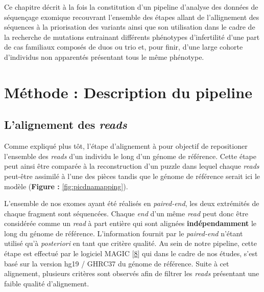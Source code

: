 \documentclass[12pt,twoside]{reedthesis}
\theoremstyle{definition}
\theoremstyle{definition}
\theoremstyle{remark}
\begin{document}
  Ce chapitre décrit à la fois la constitution d'un pipeline d'analyse des
  données de séquençage exomique recouvrant l'ensemble des étapes allant
  de l'allignement des séquences à la priorisation des variants ainsi que
  son utilisation dans le cadre de la recherche de mutations entrainant
  différents phénotypes d'infertilité d'une part de cas familiaux composés
  de duos ou trio et, pour finir, d'une large cohorte d'individus non
  apparentés présentant tous le même phénotype.
  
  \newpage
  
  \section{Méthode : Description du
  pipeline}\label{methode-description-du-pipeline}
  
  \subsection{\texorpdfstring{L'alignement des
  \emph{reads}}{L'alignement des reads}}\label{lalignement-des-reads}
  
  Comme expliqué plus tôt, l'étape d'alignement à pour objectif de
  repositioner l'ensemble des \emph{reads} d'un individu le long d'un
  génome de référence. Cette étape peut ainsi être comparée à la
  reconstruction d'un puzzle dans lequel chaque \emph{reads} peut-être
  assimilé à l'une des pièces tandis que le génome de référence serait ici
  le modèle (\textbf{Figure : }\ref{fig:picdnamapping}).
  
  L'ensemble de nos exomes ayant été réalisés en \emph{paired-end}, les
  deux extrémités de chaque fragment sont séquencées. Chaque \emph{end}
  d'un même \emph{read} peut donc être considérée comme un \emph{read} à
  part entière qui sont alignées \textbf{indépendamment} le long du génome
  de référence. L'information fournit par le \emph{paired-end} n'étant
  utilisé qu'à \emph{posteriori} en tant que critère qualité. Au sein de
  notre pipeline, cette étape est effectué par le logiciel MAGIC
  {[}\protect\hyperlink{ref-Su2014}{8}{]} qui dans le cadre de nos études,
  s'est basé sur la version hg19 / GHRC37 du génome de référence. Suite à
  cet alignement, plusieurs critères sont observés afin de filtrer les
  \emph{reads} présentant une faible qualité d'alignement.
  
\end{document}
